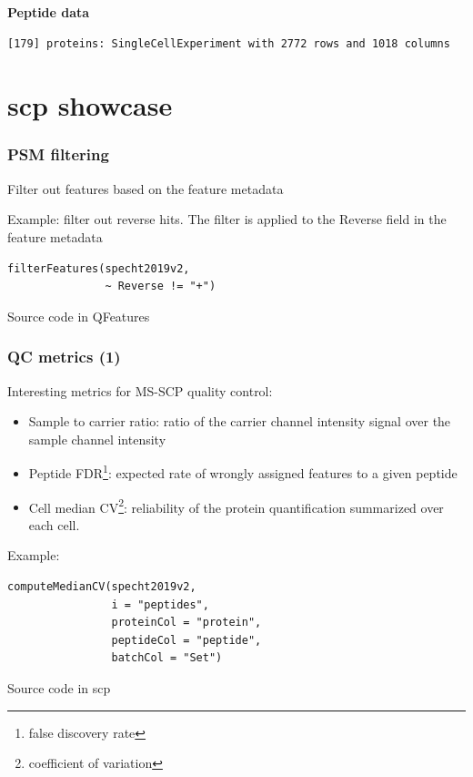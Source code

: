 \documentclass{beamer}
\newcommand{\hcode}[2][lgray]{{\ttfamily\color{vdgray}\colorbox{#1}{#2}}}
\newcommand{\frametitlesection}[1]{\frametitle{\centering #1 \footnotesize \hspace{0pt plus 1 filll} \insertsection}}
\begin{document}
\begin{frame}[fragile]
    \textbf{Peptide data}
    
    \begin{lstlisting}[language = TeX, numbers = none, basicstyle = \ttfamily\@setfontsize{\srcsize}{5pt}{5pt}\color{vdgray}]
 [179] proteins: SingleCellExperiment with 2772 rows and 1018 columns
    \end{lstlisting}
    
    
\end{frame}


\section{scp showcase}

\begin{frame}[fragile]
    \frametitlesection{PSM filtering}
    
    Filter out features based on the feature metadata
    
    \bigskip
    
    Example: filter out reverse hits. The filter is applied to the 
    \hcode{Reverse} field in the feature metadata

    \begin{lstlisting}
filterFeatures(specht2019v2, 
               ~ Reverse != "+")
    \end{lstlisting}
    
    Source code in \hcode{QFeatures}
\end{frame}

\begin{frame}[fragile]
    \frametitlesection{QC metrics (1)}
    \small
    Interesting metrics for MS-SCP quality control: 
    
    \begin{itemize}
        \item{Sample to carrier ratio}: ratio of the carrier channel intensity 
        signal over the sample channel intensity
        \item{Peptide FDR\footnote{false discovery rate}: expected rate of 
        wrongly assigned features to a given peptide}
        \item{Cell median CV\footnote{coefficient of variation}: reliability of 
        the protein quantification summarized over each cell.}
    \end{itemize}
    
    Example:

    \begin{lstlisting}
computeMedianCV(specht2019v2,
                i = "peptides", 
                proteinCol = "protein", 
                peptideCol = "peptide", 
                batchCol = "Set")
    \end{lstlisting}
    
    Source code in \hcode{scp}
    
\end{frame}
\end{document}

